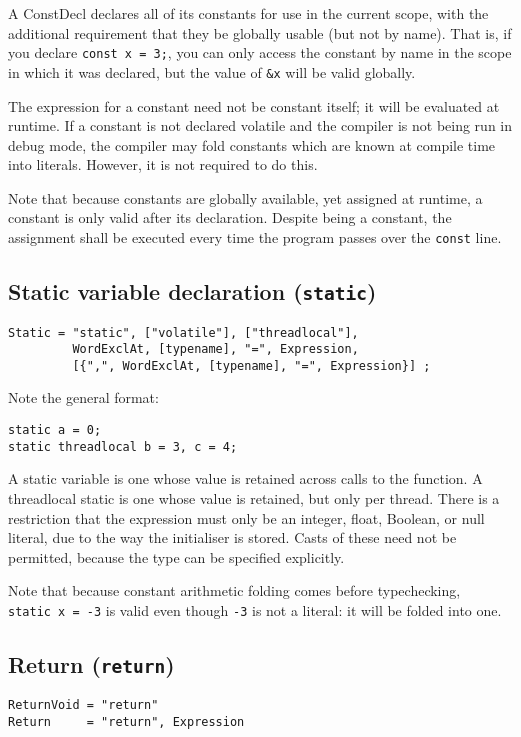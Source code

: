 \documentclass{article}
\begin{document}
A ConstDecl declares all of its constants for use in the current scope, with the
additional requirement that they be globally usable (but not by name). That is,
if you declare \texttt{const~x~=~3;}, you can only access the constant by name in
the scope in which it was declared, but the value of \texttt{\&x} will be valid
globally.

The expression for a constant need not be constant itself; it will be evaluated
at runtime. If a constant is not declared volatile and the compiler is not being
run in debug mode, the compiler may fold constants which are known at compile time
into literals. However, it is not required to do this.

Note that because constants are globally available, yet assigned at runtime, a
constant is only valid after its declaration. Despite being a constant, the
assignment shall be executed every time the program passes over the \texttt{const}
line.

\subsection{Static variable declaration (\texttt{static})}
\label{sub:statements:static}
\begin{verbatim}
Static = "static", ["volatile"], ["threadlocal"],
         WordExclAt, [typename], "=", Expression,
         [{",", WordExclAt, [typename], "=", Expression}] ;
\end{verbatim}

Note the general format:
\begin{verbatim}
static a = 0;
static threadlocal b = 3, c = 4;
\end{verbatim}

A static variable is one whose value is retained across calls to the function.
A threadlocal static is one whose value is retained, but only per thread.
There is a restriction that the expression must only be an integer, float,
Boolean, or null literal, due to the way the initialiser is stored. Casts of
these need not be permitted, because the type can be specified explicitly.

Note that because constant arithmetic folding comes before typechecking,
\texttt{static~x~=~-3} is valid even though \texttt{-3} is not a literal: it
will be folded into one.

\subsection{Return (\texttt{return})}
\label{sub:statements:return}
\begin{verbatim}
ReturnVoid = "return"
Return     = "return", Expression
\end{verbatim}
\end{document}
